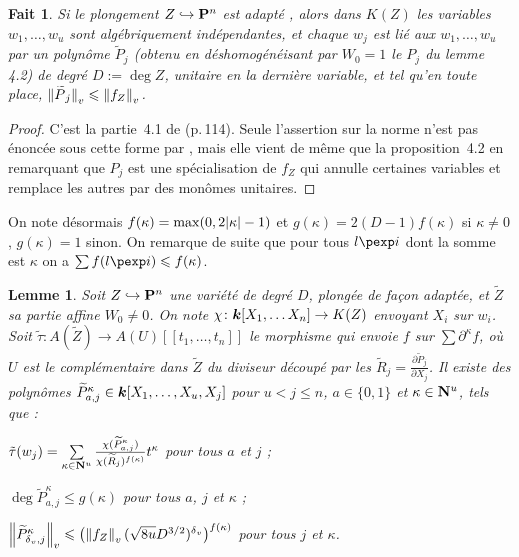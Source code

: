\documentclass[11pt, twoside, a4paper]{article}
\newtheorem{lem}[thm]{Lemme} \newtheorem{coro}[thm]{Corollaire}
\newtheorem{fait}[thm]{Fait}
\theoremstyle{definition}
\begin{document}
\begin{fait}
  Si le plongement $Z \hookrightarrow \mathbf{P}^n$ est \og adapté \fg{}, alors
  dans $K(Z)$ les variables $w_1, \ldots, w_u$ sont algébriquement
  indépendantes, et chaque $w_j$ est lié aux $w_1, \ldots, w_u$ par un
  polynôme $\widetilde P _j$ (obtenu en déshomogénéisant par $W_0 = 1$ le
  $P_j$ du lemme 4.2) de degré $D := \deg Z$, unitaire en la dernière
  variable, et tel qu'en toute place, $\left\lVert\smash{\widetilde P}_j\right\rVert_{v} \leqslant
  \left\lVert f_Z\right\rVert_{v}$.
\end{fait}

\begin{proof}
  C'est la partie~4.1 de  (p.\,114). Seule l'assertion sur la norme
  n'est pas énoncée sous cette forme par , mais elle vient de même
  que la proposition~4.2 en remarquant que $P_j$ est une spécialisation de $f_Z$
  qui annulle certaines variables et remplace les autres par des monômes
  unitaires.
\end{proof}

On note désormais $f(\kappa) = \max(0, 2{\lvert\kappa\rvert} - 1)$ et $g(\kappa) =
2(D-1)f(\kappa)$ si $\kappa \neq 0$, $g(\kappa) = 1$ sinon. On remarque de
suite que pour tous $l\pexp i$ dont la somme est $\kappa$ on a $\sum f(l\pexp i)
\le f(\kappa)$.

\begin{lem}
  Soit $Z \hookrightarrow \mathbf{P}^n$ une variété de degré $D$, plongée de façon
  adaptée, et $\widetilde Z$ sa partie affine $W_0 \neq 0$. On note $\chi \colon
  \boldsymbol{k}[X_1, \ldots X_n] \to K(Z)$ envoyant $X_i$ sur $w_i$.  Soit $\tilde\tau :
  A(\widetilde Z) \to A(U)[[t_1, \ldots, t_n]]$ le morphisme qui envoie $f$ sur
  $\sum\partial^\kappa f$, où $U$ est le complémentaire dans $\widetilde Z$ du
  diviseur découpé par les $\widetilde R_j = \frac{\partial \widetilde P _j}
  {\partial X_j}$. Il existe des polynômes $\widetilde P_{a, j}^\kappa \in
  \boldsymbol{k}[X_1, \ldots, X_u, X_j]$ pour $u < j \le n$, $a \in \{0, 1\}$ et $\kappa
  \in \mathbf{N}^u$, tels que :
  \begin{enumthm}
    \item $\tilde\tau(w_j) = \sum\limits_{\kappa\in\mathbf{N}^u}
      \frac{\chi(\widetilde P_{a, j}^\kappa)}{\chi(\widetilde
      R_j)^{f(\kappa)}} t^\kappa$ pour tous $a$ et $j$ ;
    \item $\deg \widetilde P_{a, j}^\kappa \le g(\kappa)$ pour tous $a$, $j$ et
      $\kappa$ ;
    \item $\left\lVert\widetilde P_{{\delta\smash{_v}}, j}^\kappa\right\rVert_{v} \leqslant \bigl( \left\lVert f_Z\right\rVert_{v} (\sqrt{8u}
      D^{3/2})^{\delta\smash{_v}} \bigr)^{f(\kappa)}$ pour tous $j$ et $\kappa$.
  \end{enumthm}
\end{lem}
\end{document}
